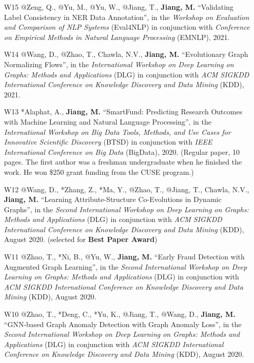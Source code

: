 \documentclass[10pt]{article}
\newenvironment{myindentpar}[1]%
{\begin{list}{}%
         {\setlength{\leftmargin}{#1}}%
         \item[]%
}
{\end{list}}
\newcounter{list}
\begin{document}
\begin{myindentpar}{0.00cm}
\begin{enumerate}[leftmargin=.5cm]
\item[W15] @Zeng, Q., @Yu, M., @Yu, W., @Jiang, T., \textbf{Jiang, M.} ``Validating Label Consistency in NER Data Annotation'', in the \textit{Workshop on Evaluation and Comparison of NLP Systems} (Eval4NLP) in conjunction with \textit{Conference on Empirical Methods in Natural Language Processing} (EMNLP), 2021.

\item[W14] @Wang, D., @Zhao, T., Chawla, N.V., \textbf{Jiang, M.} ``Evolutionary Graph Normalizing Flows'', in the \textit{International Workshop on Deep Learning on Graphs: Methods and Applications} (DLG) in conjunction with \textit{ACM SIGKDD International Conference on Knowledge Discovery and Data Mining} (KDD), 2021.

\item[W13] *Alaphat, A., \textbf{Jiang, M.} ``SmartFund: Predicting Research Outcomes with Machine Learning and Natural Language Processing'', in the \textit{International Workshop on Big Data Tools, Methods, and Use Cases for Innovative Scientific Discovery} (BTSD) in conjunction with \textit{IEEE International Conference on Big Data} (BigData), 2020. (Regular paper, 10 pages. The first author was a freshman undergraduate when he finished the work. He won \$250 grant funding from the CUSE program.)

\item[W12] @Wang, D., *Zhang, Z., *Ma, Y., @Zhao, T., @Jiang, T., Chawla, N.V., \textbf{Jiang, M.} ``Learning Attribute-Structure Co-Evolutions in Dynamic Graphs'', in the \textit{Second International Workshop on Deep Learning on Graphs: Methods and Applications} (DLG) in conjunction with \textit{ACM SIGKDD International Conference on Knowledge Discovery and Data Mining} (KDD), August 2020. (selected for \textbf{Best Paper Award})

\item[W11] @Zhao, T., *Ni, B., @Yu, W., \textbf{Jiang, M.} ``Early Fraud Detection with Augmented Graph Learning'', in the \textit{Second International Workshop on Deep Learning on Graphs: Methods and Applications} (DLG) in conjunction with \textit{ACM SIGKDD International Conference on Knowledge Discovery and Data Mining} (KDD), August 2020.

\item[W10] @Zhao, T., *Deng, C., *Yu, K., @Jiang, T., @Wang, D., \textbf{Jiang, M.} ``GNN-based Graph Anomaly Detection with Graph Anomaly Loss'', in the \textit{Second International Workshop on Deep Learning on Graphs: Methods and Applications} (DLG) in conjunction with \textit{ACM SIGKDD International Conference on Knowledge Discovery and Data Mining} (KDD), August 2020.


\end{enumerate}
\end{myindentpar}
\end{document}
